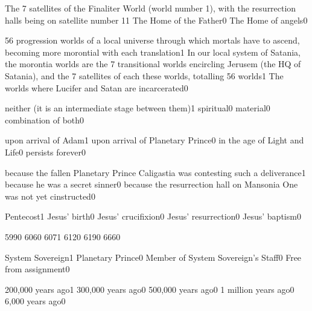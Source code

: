 {The 7 satellites of the Finaliter World (world number 1), with the resurrection halls being on satellite number 1}{1}
{The Home of the Father}{0}
{The Home of angels}{0}
\qstop

{56 progression worlds of a local universe through which mortals have to ascend, becoming more morontial with each translation}{1}
{In our local system of Satania, the morontia worlds are the 7 transitional worlds encircling Jerusem (the HQ of Satania), and the 7 satellites of each these worlds, totalling 56 worlds}{1}
{The worlds where Lucifer and Satan are incarcerated}{0}
\qstop

{neither (it is an intermediate stage between them)}{1}
{spiritual}{0}
{material}{0}
{combination of both}{0}
\qstop




{upon arrival of Adam}{1}
{upon arrival of Planetary Prince}{0}
{in the age of Light and Life}{0}
{persists forever}{0}
\qstop


{because the fallen Planetary Prince Caligastia was contesting such a deliverance}{1}
{because he was a secret sinner}{0}
{because the resurrection hall on Mansonia One was not yet cinstructed}{0}
\qstop

{Pentecost}{1}
{Jesus' birth}{0}
{Jesus' crucifixion}{0}
{Jesus' resurrection}{0}
{Jesus' baptism}{0}
\qstop


{599}{0}
{606}{0}
{607}{1}
{612}{0}
{619}{0}
{666}{0}
\qstop

{System Sovereign}{1}
{Planetary Prince}{0}
{Member of System Sovereign's Staff}{0}
{Free from assignment}{0}
\qstop

{200,000 years ago}{1}
{300,000 years ago}{0}
{500,000 years ago}{0}
{1 million years ago}{0}
{6,000 years ago}{0}
\qstop

